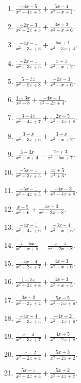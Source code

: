\documentclass[11pt,oneside]{book}
\begin{document}
\begin{enumerate}[leftmargin=*,label=\textbf{W\arabic*.},itemsep=0.45\baselineskip]
\item $\displaystyle \frac{- 3 x - 5}{x^{2} + 4 x + 5} + \frac{5 x - 4}{x^{2} - x + 1}$.
\item $\displaystyle \frac{- 2 x - 3}{x^{2} - 2 x + 3} + \frac{3 x + 3}{x^{2} + x + 6}$.
\item $\displaystyle \frac{- 4 x - 1}{x^{2} - 3 x + 3} + \frac{5 x + 1}{x^{2} - 3 x + 4}$.
\item $\displaystyle \frac{- 2 x - 1}{x^{2} + 3 x + 5} + \frac{x - 1}{x^{2} - x + 2}$.
\item $\displaystyle \frac{5 - 3 x}{x^{2} - 5 x + 8} + \frac{- 2 x - 3}{x^{2} - x + 6}$.
\item $\displaystyle \frac{1 - 3 x}{x^{2} + 8} + \frac{- 4 x - 1}{x^{2} - 2 x + 4}$.
\item $\displaystyle \frac{3 - 4 x}{x^{2} - 4 x + 7} + \frac{2 x - 5}{x^{2} - 4 x + 8}$.
\item $\displaystyle \frac{3 - x}{x^{2} + 3 x + 6} + \frac{3 - x}{x^{2} + x + 2}$.
\item $\displaystyle \frac{3 - 3 x}{x^{2} + x + 4} + \frac{2 x + 3}{x^{2} - 5 x + 7}$.
\item $\displaystyle \frac{- 5 x - 1}{x^{2} + 3 x + 5} + \frac{4 x + 5}{x^{2} + 6}$.
\item $\displaystyle \frac{- 5 x - 1}{x^{2} + 4 x + 5} + \frac{- 4 x - 3}{x^{2} - 4 x + 8}$.
\item $\displaystyle \frac{x - 5}{x^{2} + 6} + \frac{4 x + 3}{x^{2} + 2 x + 8}$.
\item $\displaystyle \frac{- 4 x - 1}{x^{2} + 4 x + 6} + \frac{- 3 x - 4}{x^{2} - x + 5}$.
\item $\displaystyle \frac{4 - 5 x}{x^{2} - x + 5} + \frac{x - 4}{x^{2} - 2 x + 8}$.
\item $\displaystyle \frac{- 4 x - 4}{x^{2} + 2 x + 7} + \frac{4 x + 3}{x^{2} - x + 6}$.
\item $\displaystyle \frac{1 - 3 x}{x^{2} + 3 x + 8} + \frac{4 x + 3}{x^{2} + x + 5}$.
\item $\displaystyle \frac{3 x + 2}{x^{2} - 3 x + 4} + \frac{5 x - 5}{x^{2} - 3 x + 6}$.
\item $\displaystyle \frac{- 4 x - 4}{x^{2} - 3 x + 5} + \frac{- 4 x - 2}{x^{2} + 4 x + 6}$.
\item $\displaystyle \frac{x - 4}{x^{2} + 3 x + 7} + \frac{4 x + 5}{x^{2} - 2 x + 8}$.
\item $\displaystyle \frac{- x - 2}{x^{2} - 2 x + 4} + \frac{5 x + 3}{x^{2} - 2 x + 2}$.
\item $\displaystyle \frac{5 x + 1}{x^{2} + 3 x + 3} + \frac{5 x + 2}{x^{2} + 4 x + 7}$.

\end{enumerate}
\end{document}

